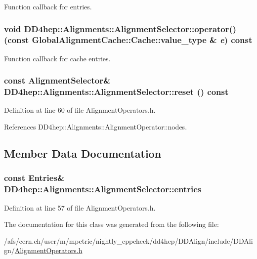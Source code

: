 Function callback for entries. \hypertarget{class_d_d4hep_1_1_alignments_1_1_alignment_selector_adc9ad4c93f7ee53394ce4bfba81d8283}{
\subsubsection[{operator()}]{\setlength{\rightskip}{0pt plus 5cm}void DD4hep::Alignments::AlignmentSelector::operator() (const GlobalAlignmentCache::Cache::value\_\-type \& {\em e}) const}}
\label{class_d_d4hep_1_1_alignments_1_1_alignment_selector_adc9ad4c93f7ee53394ce4bfba81d8283}


Function callback for cache entries. \hypertarget{class_d_d4hep_1_1_alignments_1_1_alignment_selector_ab8422a79dc1c5d79309d68ca2d554584}{
\subsubsection[{reset}]{\setlength{\rightskip}{0pt plus 5cm}const {\bf AlignmentSelector}\& DD4hep::Alignments::AlignmentSelector::reset () const}}
\label{class_d_d4hep_1_1_alignments_1_1_alignment_selector_ab8422a79dc1c5d79309d68ca2d554584}


Definition at line 60 of file AlignmentOperators.h.

References DD4hep::Alignments::AlignmentOperator::nodes.

\subsection{Member Data Documentation}
\hypertarget{class_d_d4hep_1_1_alignments_1_1_alignment_selector_ab948717c701b7aff5c744f8624cf8473}{
\subsubsection[{entries}]{\setlength{\rightskip}{0pt plus 5cm}const {\bf Entries}\& {\bf DD4hep::Alignments::AlignmentSelector::entries}}}
\label{class_d_d4hep_1_1_alignments_1_1_alignment_selector_ab948717c701b7aff5c744f8624cf8473}


Definition at line 57 of file AlignmentOperators.h.

The documentation for this class was generated from the following file:\begin{DoxyCompactItemize}
\item 
/afs/cern.ch/user/m/mpetric/nightly\_\-cppcheck/dd4hep/DDAlign/include/DDAlign/\hyperlink{_alignment_operators_8h}{AlignmentOperators.h}\end{DoxyCompactItemize}
